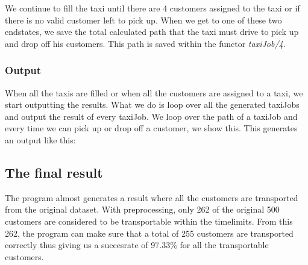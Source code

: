 \documentclass[10pt,a4paper]{article}
\begin{document}
We continue to fill the taxi until there are 4 customers assigned to the taxi or if there is no valid customer left to pick up. When we get to one of these two endstates, we save the total calculated path that the taxi must drive to pick up and drop off his customers. This path is saved within the functor \textit{taxiJob/4}.

\subsubsection{Output}

When all the taxis are filled or when all the customers are assigned to a taxi, we start outputting the results. What we do is loop over all the generated taxiJobs and output the result of every taxiJob. We loop over the path of a taxiJob and every time we can pick up or drop off a customer, we show this. This generates an output like this:

\begin{quote}
\end{quote}

\subsection{The final result}
The program almost generates a result where all the customers are transported from the original dataset. With preprocessing, only 262 of the original 500 customers are considered to be transportable within the timelimits. From this 262, the program can make sure that a total of 255 customers are transported correctly thus giving us a succesrate of 97.33\% for all the transportable customers.
\end{document}
